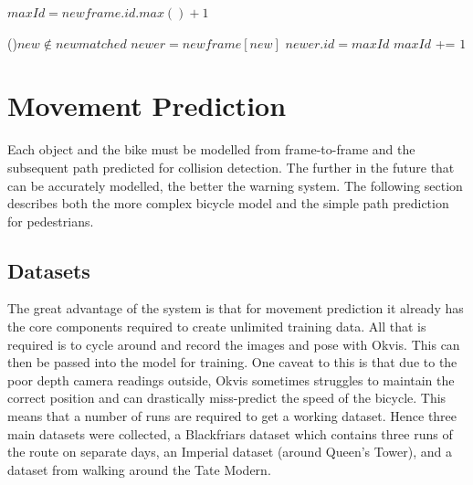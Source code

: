 \documentclass[11pt,twoside]{report}
\begin{document}
\newpage

$maxId = new$\textunderscore$frame.id.max()+1$ 

\ForEach(){$new \notin new$\textunderscore$matched$}{
$newer = new$\textunderscore$frame[new]$ 
$newer.id = maxId$ 
$maxId$ += $1$ 
}


\section{Movement Prediction}

Each object and the bike must be modelled from frame-to-frame and the subsequent path predicted for collision detection. The further in the future that can be accurately modelled, the better the warning system. The following section describes both the more complex bicycle model and the simple path prediction for pedestrians.


\subsection{Datasets}
The great advantage of the system is that for movement prediction it already has the core components required to create unlimited training data. All that is required is to cycle around and record the images and pose with Okvis. This can then be passed into the model for training. One caveat to this is that due to the poor depth camera readings outside, Okvis sometimes struggles to maintain the correct position and can drastically miss-predict the speed of the bicycle. This means that a number of runs are required to get a working dataset. Hence three main datasets were collected, a Blackfriars dataset which contains three runs of the route on separate days, an Imperial dataset (around Queen's Tower), and a dataset from walking around the Tate Modern.
\end{document}
